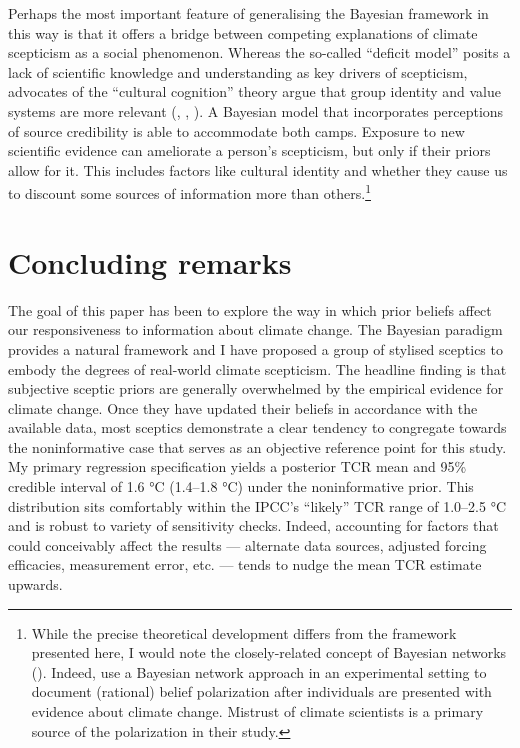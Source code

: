 \documentclass[smallextended]{svjour3}       %
\begin{document}
Perhaps the most important feature of generalising the Bayesian
framework in this way is that it offers a bridge between competing
explanations of climate scepticism as a social phenomenon. Whereas the
so-called ``deficit model'' posits a lack of scientific knowledge and
understanding as key drivers of scepticism, advocates of the ``cultural
cognition'' theory argue that group identity and value systems are more
relevant (\cite{kahan2011cultural}, \cite{kahan2012polarizing},
\cite{ranney2016climate}). A Bayesian model that incorporates
perceptions of source credibility is able to accommodate both camps.
Exposure to new scientific evidence can ameliorate a person's
scepticism, but only if their priors allow for it. This includes factors
like cultural identity and whether they cause us to discount some
sources of information more than others.\footnote{While the precise
  theoretical development differs from the framework presented here, I
  would note the closely-related concept of Bayesian networks
  (\cite{pearl2000bayesian}). Indeed, \cite{cook2016rational} use a
  Bayesian network approach in an experimental setting to document
  (rational) belief polarization after individuals are presented with
  evidence about climate change. Mistrust of climate scientists is a
  primary source of the polarization in their study.}

\hypertarget{sec:conclusion}{%
\section{Concluding remarks}\label{sec:conclusion}}

The goal of this paper has been to explore the way in which prior
beliefs affect our responsiveness to information about climate change.
The Bayesian paradigm provides a natural framework and I have proposed a
group of stylised sceptics to embody the degrees of real-world climate
scepticism. The headline finding is that subjective sceptic priors are
generally overwhelmed by the empirical evidence for climate change. Once
they have updated their beliefs in accordance with the available data,
most sceptics demonstrate a clear tendency to congregate towards the
noninformative case that serves as an objective reference point for this
study. My primary regression specification yields a posterior TCR mean
and 95\% credible interval of 1.6 °C (1.4--1.8 °C) under the
noninformative prior. This distribution sits comfortably within the
IPCC's ``likely'' TCR range of 1.0--2.5 °C and is robust to variety of
sensitivity checks. Indeed, accounting for factors that could
conceivably affect the results --- alternate data sources, adjusted
forcing efficacies, measurement error, etc. --- tends to nudge the mean
TCR estimate upwards.
\end{document}
